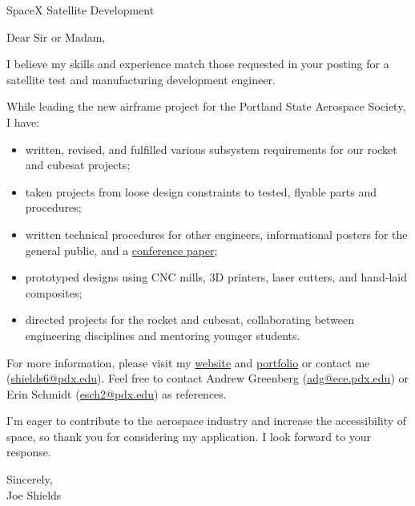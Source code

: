 \documentclass[letterpaper]{letter}
\begin{document}
\large

\begin{letter}{SpaceX Satellite Development}
\opening{Dear Sir or Madam,}

I believe my skills and experience match those requested in your posting for a satellite test and manufacturing development engineer. 

While leading the new airframe project for the Portland State Aerospace Society, I have: 
\begin{itemize}
	\item written, revised, and fulfilled various subsystem requirements for our rocket and cubesat projects;
	\item taken projects from loose design constraints to tested, flyable parts and procedures;
	\item written technical procedures for other engineers, informational posters for the general public, and a \href{http://arc.aiaa.org/doi/pdf/10.2514/6.2016-5365}{conference paper};
	\item prototyped designs using CNC mills, 3D printers, laser cutters, and hand-laid composites;
	\item directed projects for the rocket and cubesat, collaborating between engineering disciplines and mentoring younger students.
\end{itemize}
For more information, please visit my \href{http://joedang.github.io}{website} and \href{http://github.com/Joedang/Portfolio}{portfolio} or contact me (\href{mailto:shields6@pdx.edu}{shields6@pdx.edu}).
Feel free to contact Andrew Greenberg (\href{mailto:adg@ece.pdx.edu}{adg@ece.pdx.edu}) or Erin Schmidt (\href{mailto:esch2@pdx.edu}{esch2@pdx.edu}) as references. 

I'm eager to contribute to the aerospace industry and increase the accessibility of space, so thank you for considering my application. I look forward to your response. 

\closing{Sincerely,\\ Joe Shields}
\end{letter}
\end{document}
